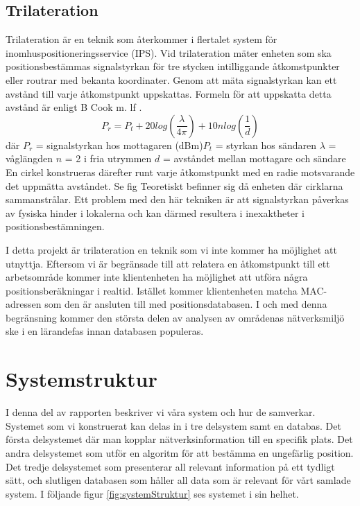 \documentclass[swedish, a4paper,12pt]{article}
\begin{document}
\subsection{Trilateration}
Trilateration är en teknik som återkommer i flertalet system för inomhuspositioneringsservice (IPS). Vid trilateration mäter enheten som ska positionsbestämmas signalstyrkan för tre stycken intilliggande åtkomstpunkter eller routrar med bekanta koordinater. Genom att mäta signalstyrkan kan ett avstånd till varje åtkomstpunkt uppskattas. Formeln för att uppskatta detta avstånd är enligt B Cook m. lf \cite{cook2005indoor}.
\newline
$$ P_r = P_t + 20log(\frac{\lambda}{4\pi}) + 10nlog(\frac{1}{d})$$
där
$  P_r $ = signalstyrkan hos mottagaren (dBm)\newline $P_t$ = styrkan hos sändaren\newline
$\lambda$ = våglängden\newline
$ n $ = 2 i fria utrymmen\newline
$ d $ = avståndet mellan mottagare och sändare
\bigskip
\newline
En cirkel konstrueras därefter runt varje åtkomstpunkt med en radie motsvarande det uppmätta avståndet. Se fig %
Teoretiskt befinner sig då enheten där cirklarna sammanstrålar. Ett problem med den här tekniken är att signalstyrkan påverkas av fysiska hinder i lokalerna och kan därmed resultera i inexaktheter i positionsbestämningen.

I detta projekt är trilateration en teknik som vi inte kommer ha möjlighet att utnyttja. Eftersom vi är begränsade till att relatera en åtkomstpunkt till ett arbetsområde kommer inte klientenheten ha möjlighet att utföra några positionsberäkningar i realtid. Istället kommer klientenheten matcha MAC-adressen som den är ansluten till med positionsdatabasen. I och med denna begränsning kommer den största delen av analysen av områdenas nätverksmiljö ske i en lärandefas innan databasen populeras.
\fi


\section{Systemstruktur}
I denna del av rapporten beskriver vi våra system och hur de samverkar.
Systemet som vi konstruerat kan delas in i tre delsystem samt en databas. Det första delsystemet där man kopplar nätverksinformation till en specifik plats. Det andra delsystemet som utför en algoritm för att bestämma en ungefärlig position. Det tredje delsystemet som presenterar all relevant information på ett tydligt sätt, och slutligen databasen som håller all data som är relevant för vårt samlade system.
I följande figur \ref{fig:systemStruktur} ses systemet i sin helhet.
\end{document}
